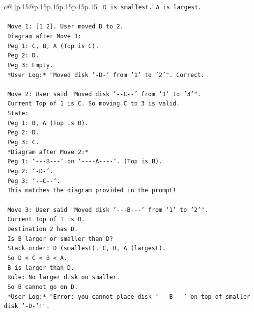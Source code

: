 \documentclass{article}
\begin{document}
{\begin{supertabular}{c@{$\;$}|p{.15\linewidth}@{}p{.15\linewidth}p{.15\linewidth}p{.15\linewidth}p{.15\linewidth}p{.15\linewidth}}
{{{\texttt{   D is smallest. A is largest.} \\
\\ 
\texttt{   Move 1: {[}1 2{]}. User moved D to 2.} \\
\texttt{   Diagram after Move 1:} \\
\texttt{   Peg 1: C, B, A (Top is C).} \\
\texttt{   Peg 2: D.} \\
\texttt{   Peg 3: Empty.} \\
\texttt{   *User Log:* "Moved disk '{-}D{-}' from '1' to '2'". Correct.} \\
\\ 
\texttt{   Move 2: User said "Moved disk '{-}{-}C{-}{-}' from '1' to '3'".} \\
\texttt{   Current Top of 1 is C. So moving C to 3 is valid.} \\
\texttt{   State:} \\
\texttt{   Peg 1: B, A (Top is B).} \\
\texttt{   Peg 2: D.} \\
\texttt{   Peg 3: C.} \\
\texttt{   *Diagram after Move 2:*} \\
\texttt{   Peg 1: `{-}{-}{-}B{-}{-}{-}` on `{-}{-}{-}{-}A{-}{-}{-}{-}`. (Top is B).} \\
\texttt{   Peg 2: `{-}D{-}`.} \\
\texttt{   Peg 3: `{-}{-}C{-}{-}`.} \\
\texttt{   This matches the diagram provided in the prompt!} \\
\\ 
\texttt{   Move 3: User said "Moved disk '{-}{-}{-}B{-}{-}{-}' from '1' to '2'".} \\
\texttt{   Current Top of 1 is B.} \\
\texttt{   Destination 2 has D.} \\
\texttt{   Is B larger or smaller than D?} \\
\texttt{   Stack order: D (smallest), C, B, A (largest).} \\
\texttt{   So D < C < B < A.} \\
\texttt{   B is larger than D.} \\
\texttt{   Rule: No larger disk on smaller.} \\
\texttt{   So B cannot go on D.} \\
\texttt{   *User Log:* "Error: you cannot place disk '{-}{-}{-}B{-}{-}{-}' on top of smaller disk '{-}D{-}'!".} \\
}}}
\end{supertabular}}
\end{document}
